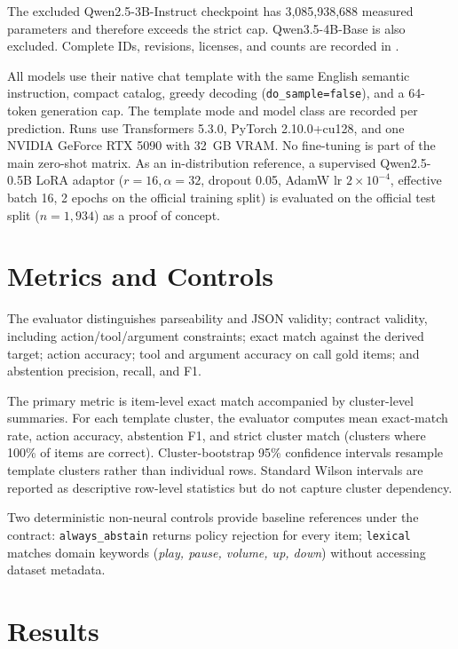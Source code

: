 \documentclass[12pt]{article}
\begin{document}
The excluded Qwen2.5-3B-Instruct checkpoint has 3,085,938,688 measured parameters and therefore exceeds the strict cap. Qwen3.5-4B-Base is also excluded. Complete IDs, revisions, licenses, and counts are recorded in .

All models use their native chat template with the same English semantic instruction, compact catalog, greedy decoding (\texttt{do\_sample=false}), and a 64-token generation cap. The template mode and model class are recorded per prediction. Runs use Transformers 5.3.0, PyTorch 2.10.0+cu128, and one NVIDIA GeForce RTX 5090 with 32~GB VRAM. No fine-tuning is part of the main zero-shot matrix. As an in-distribution reference, a supervised Qwen2.5-0.5B LoRA adaptor ($r=16, \alpha=32$, dropout 0.05, AdamW lr $2\times 10^{-4}$, effective batch 16, 2 epochs on the official training split) is evaluated on the official test split ($n=1{,}934$) as a proof of concept.

\section{Metrics and Controls}

The evaluator distinguishes parseability and JSON validity; contract validity, including action/tool/argument constraints; exact match against the derived target; action accuracy; tool and argument accuracy on call gold items; and abstention precision, recall, and F1.

The primary metric is item-level exact match accompanied by cluster-level summaries. For each template cluster, the evaluator computes mean exact-match rate, action accuracy, abstention F1, and strict cluster match (clusters where 100\% of items are correct). Cluster-bootstrap 95\% confidence intervals resample template clusters rather than individual rows. Standard Wilson intervals are reported as descriptive row-level statistics but do not capture cluster dependency.

Two deterministic non-neural controls provide baseline references under the contract: \texttt{always\_abstain} returns policy rejection for every item; \texttt{lexical} matches domain keywords (\textit{play, pause, volume, up, down}) without accessing dataset metadata.

\section{Results}
\end{document}
